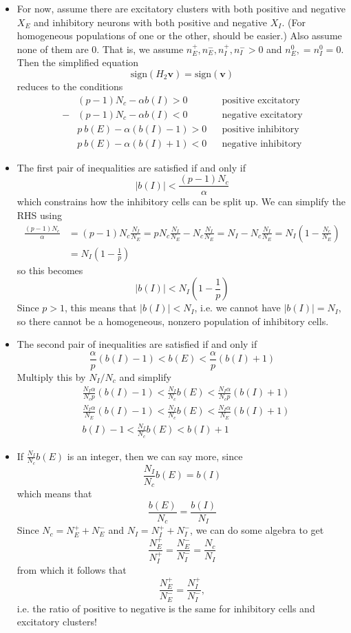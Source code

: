 \documentclass[11pt,reqno]{amsart}
\begin{document}
\begin{itemize}
\item For now, assume there are excitatory clusters with both positive and negative $X_E$ and inhibitory neurons with both positive and negative $X_I$. (For homogeneous populations of one or the other, should be easier.) Also assume none of them are 0.  That is, we assume
 $n_E^+, n_E^-, n_I^+, n_I^- > 0$ and $n_E^0, = n_I^0 = 0$. Then the simplified equation 
\[ \text{sign}(H_2 \textbf{v}) = \text{sign}(\textbf{v}) \]
reduces to the conditions
\begin{align*}
&(p-1) N_c - \alpha b(I) > 0 && \text{positive excitatory} \\
-&(p-1) N_c - \alpha b(I) < 0 && \text{negative excitatory} \\
&p\:b(E) - \alpha (b(I)-1) > 0 && \text{positive inhibitory} \\
&p\:b(E) - \alpha (b(I)+1) < 0 && \text{negative inhibitory} 
\end{align*}

\item The first pair of inequalities are satisfied if and only if
\[
|b(I)| < \frac{(p-1) N_c}{\alpha}
\]
which constrains how the inhibitory cells can be split up. We can simplify the RHS using
\begin{align*}
\frac{(p-1) N_c}{\alpha}
&= (p-1) N_c \frac{N_I}{N_E}
= p N_c \frac{N_I}{N_E} - N_c \frac{N_I}{N_E} = N_I - N_c \frac{N_I}{N_E}
= N_I\left( 1 - \frac{N_c}{N_E} \right) \\
&= N_I\left( 1 - \frac{1}{p} \right)
\end{align*}
so this becomes
\[
|b(I)| < N_I\left( 1 - \frac{1}{p} \right)
\]
Since $p > 1$, this means that $|b(I)| <  N_I$, i.e. we cannot have $|b(I)| = N_I$, so there cannot be a homogeneous, nonzero population of inhibitory cells.

\item The second pair of inequalities are satisfied if and only if
\[
\frac{\alpha}{p}(b(I)-1) < b(E) < \frac{\alpha}{p}(b(I)+1)
\]
Multiply this by $N_I/N_c$ and simplify
\begin{align*}
&\frac{N_I \alpha}{N_c p}(b(I)-1) < \frac{N_I}{N_c} b(E) < \frac{N_I \alpha}{N_c p}(b(I)+1) \\
&\frac{N_I \alpha}{N_E}(b(I)-1) < \frac{N_I}{N_c} b(E) < \frac{N_I \alpha}{N_E}(b(I)+1) \\
&b(I)-1 < \frac{N_I}{N_c} b(E) < b(I)+1
\end{align*}

\item If $\frac{N_I}{N_c} b(E)$ is an integer, then we can say more, since
\[
\frac{N_I}{N_c} b(E) = b(I)
\]
which means that
\[
\frac{b(E)}{N_c} = \frac{b(I)}{N_I}
\]
Since $N_c = N_E^+ + N_E^-$ and $N_I = N_I^+ + N_I^-$, we can do some algebra to get
\[
\frac{N_E^+}{N_I^+} = \frac{N_E^-}{N_I^-} =
\frac{N_c}{N_I}
\]
from which it follows that
\[
\frac{N_E^+}{N_E^-} = \frac{N_I^+}{N_I^-},
\]
i.e. the ratio of positive to negative is the same for inhibitory cells and excitatory clusters!


\end{itemize}
\end{document}
